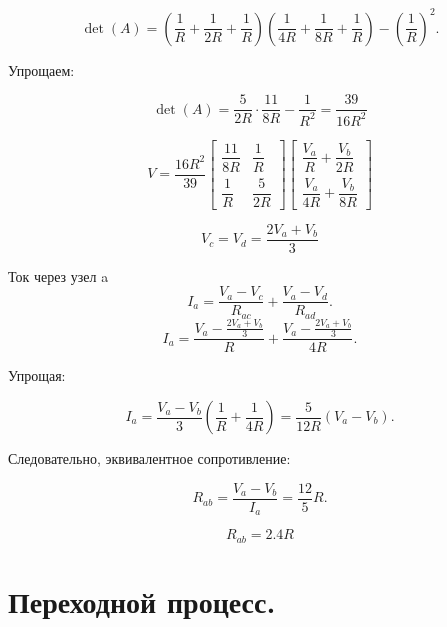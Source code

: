 \documentclass[12pt,a4paper]{article}
\begin{document}
	\[
	\det(A) =
	\left(\dfrac{1}{R} + \dfrac{1}{2R} + \dfrac{1}{R}\right)
	\left(\dfrac{1}{4R} + \dfrac{1}{8R} + \dfrac{1}{R}\right)
	- \left(\dfrac{1}{R}\right)^2.
	\]
	
	Упрощаем:
	
	\[
	\det(A) =
	\dfrac{5}{2R} \cdot \dfrac{11}{8R} - \dfrac{1}{R^2} = 
	\dfrac{39}{16R^2}
	\]
	
	\[
	V = \frac{16R^2}{39}
	\begin{bmatrix}
		\dfrac{11}{8R} & \dfrac{1}{R} \\[2ex]
		\dfrac{1}{R} & \dfrac{5}{2R}
	\end{bmatrix}
	\begin{bmatrix}
		\dfrac{V_a}{R} + \dfrac{V_b}{2R} \\[2ex]
		\dfrac{V_a}{4R} + \dfrac{V_b}{8R}
	\end{bmatrix}
	\]
	
	
	\[
	\boxed{\,V_c = V_d = \frac{2V_a + V_b}{3}\,}
	\]
	
	
	Ток через узел a
	\[
	I_a = \frac{V_a - V_c}{R_{ac}} + \frac{V_a - V_d}{R_{ad}}.
	\]
	\[
	I_a = \frac{V_a - \tfrac{2V_a+V_b}{3}}{R} + \frac{V_a - \tfrac{2V_a+V_b}{3}}{4R}.
	\]
	
	Упрощая:
	
	\[
	I_a = \frac{V_a - V_b}{3}\left(\frac{1}{R}+\frac{1}{4R}\right)
	= \frac{5}{12R}(V_a - V_b).
	\]
	
	Следовательно, эквивалентное сопротивление:
	
	\[
	R_{ab} = \frac{V_a - V_b}{I_a} = \frac{12}{5}R.
	\]
	
	\[
	\boxed{R_{ab} = 2.4R}
	\]
	
	
	\section*{Переходной процесс.}
\end{document}
